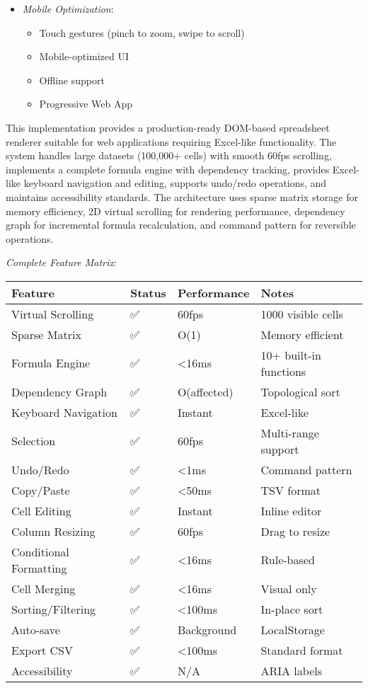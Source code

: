 \documentclass[11pt]{article}
\begin{document}
\begin{itemize}
\item \emph{Mobile Optimization}:
\begin{itemize}
\item Touch gestures (pinch to zoom, swipe to scroll)
\item Mobile-optimized UI
\item Offline support
\item Progressive Web App
\end{itemize}
\end{itemize}

This implementation provides a production-ready DOM-based spreadsheet renderer suitable for web applications requiring Excel-like functionality. The system handles large datasets (100,000+ cells) with smooth 60fps scrolling, implements a complete formula engine with dependency tracking, provides Excel-like keyboard navigation and editing, supports undo/redo operations, and maintains accessibility standards. The architecture uses sparse matrix storage for memory efficiency, 2D virtual scrolling for rendering performance, dependency graph for incremental formula recalculation, and command pattern for reversible operations.

\emph{Complete Feature Matrix}:

\begin{center}
\begin{tabular}{llll}
Feature & Status & Performance & Notes\\
\hline
Virtual Scrolling & ✅ & 60fps & 1000 visible cells\\
Sparse Matrix & ✅ & O(1) & Memory efficient\\
Formula Engine & ✅ & <16ms & 10+ built-in functions\\
Dependency Graph & ✅ & O(affected) & Topological sort\\
Keyboard Navigation & ✅ & Instant & Excel-like\\
Selection & ✅ & 60fps & Multi-range support\\
Undo/Redo & ✅ & <1ms & Command pattern\\
Copy/Paste & ✅ & <50ms & TSV format\\
Cell Editing & ✅ & Instant & Inline editor\\
Column Resizing & ✅ & 60fps & Drag to resize\\
Conditional Formatting & ✅ & <16ms & Rule-based\\
Cell Merging & ✅ & <16ms & Visual only\\
Sorting/Filtering & ✅ & <100ms & In-place sort\\
Auto-save & ✅ & Background & LocalStorage\\
Export CSV & ✅ & <100ms & Standard format\\
Accessibility & ✅ & N/A & ARIA labels\\
\end{tabular}
\end{center}
\end{document}
